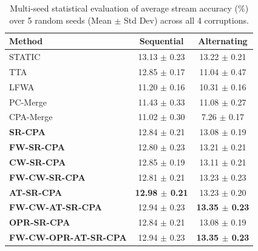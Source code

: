 \documentclass{article}
\theoremstyle{plain}
\theoremstyle{definition}
\theoremstyle{remark}
\begin{document}
\begin{table}[tb]
\caption{Multi-seed statistical evaluation of average stream accuracy (\%) over 5 random seeds (Mean $\pm$ Std Dev) across all 4 corruptions.}
\label{tab:multi_seed}
\begin{center}
\begin{footnotesize}
\begin{sc}
\setlength{\tabcolsep}{3pt}
\begin{tabular}{lcc}
\toprule
Method & Sequential & Alternating \\
\midrule
STATIC & 13.13 $\pm$ 0.23 & 13.22 $\pm$ 0.21 \\
TTA & 12.85 $\pm$ 0.17 & 11.04 $\pm$ 0.47 \\
LFWA & 11.20 $\pm$ 0.16 & 10.31 $\pm$ 0.16 \\
PC-Merge & 11.43 $\pm$ 0.33 & 11.08 $\pm$ 0.27 \\
CPA-Merge & 11.02 $\pm$ 0.30 & \phantom{0}7.26 $\pm$ 0.17 \\
\midrule
\textbf{SR-CPA} & 12.84 $\pm$ 0.21 & 13.08 $\pm$ 0.19 \\
\textbf{FW-SR-CPA} & 12.80 $\pm$ 0.23 & 13.21 $\pm$ 0.21 \\
\textbf{CW-SR-CPA} & 12.85 $\pm$ 0.19 & 13.11 $\pm$ 0.21 \\
\textbf{FW-CW-SR-CPA} & 12.81 $\pm$ 0.21 & 13.23 $\pm$ 0.23 \\
\textbf{AT-SR-CPA} & \textbf{12.98 $\pm$ 0.21} & 13.23 $\pm$ 0.20 \\
\textbf{FW-CW-AT-SR-CPA} & 12.94 $\pm$ 0.23 & \textbf{13.35 $\pm$ 0.23} \\
\textbf{OPR-SR-CPA} & 12.84 $\pm$ 0.21 & 13.08 $\pm$ 0.19 \\
\textbf{FW-CW-OPR-AT-SR-CPA} & 12.94 $\pm$ 0.23 & \textbf{13.35 $\pm$ 0.23} \\
\bottomrule
\end{tabular}
\end{sc}
\end{footnotesize}
\end{center}
\vskip -0.1in
\end{table}
\end{document}
